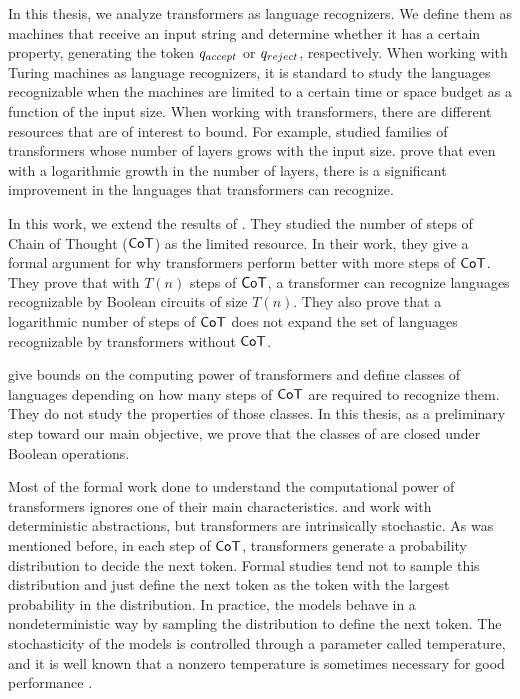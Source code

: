 \bigskip

In this thesis, we analyze transformers as language recognizers.
We define them as machines that receive an input string and determine whether it has a certain property, generating the token $q_{accept}$ or $q_{reject}$, respectively.
When working with Turing machines as language recognizers, it is standard to study the languages recognizable when the machines are limited to a certain time or space budget as a function of the input size.
When working with transformers, there are different resources that are of interest to bound.
For example, \citet{merrill2026little} studied families of transformers whose number of layers grows with the input size.
\citet{merrill2026little} prove that even with a logarithmic growth in the number of layers, there is a significant improvement in the languages that transformers can recognize.

In this work, we extend the results of \citet{toyota}.
They studied the number of steps of Chain of Thought ($\mathsf{CoT}$) as the limited resource.
In their work, they give a formal argument for why transformers perform better with more steps of $\mathsf{CoT}$.
They prove that with $T(n)$ steps of $\mathsf{CoT}$, a transformer can recognize languages recognizable by Boolean circuits of size $T(n)$.
They also prove that a logarithmic number of steps of $\mathsf{CoT}$ does not expand the set of languages recognizable by transformers without $\mathsf{CoT}$.

\citet{toyota} give bounds on the computing power of transformers and define classes of languages depending on how many steps of $\mathsf{CoT}$ are required to recognize them.
They do not study the properties of those classes.
In this thesis, as a preliminary step toward our main objective, we prove that the classes of \citet{toyota} are closed under Boolean operations.

\medskip

Most of the formal work done to understand the computational power of transformers ignores one of their main characteristics.
\citet{toyota} and \citet{merrill2026little} work with deterministic abstractions, but transformers are intrinsically stochastic.
As was mentioned before, in each step of $\mathsf{CoT}$, transformers generate a probability distribution to decide the next token.
Formal studies tend not to sample this distribution and just define the next token as the token with the largest probability in the distribution.
In practice, the models behave in a nondeterministic way by sampling the distribution to define the next token.
The stochasticity of the models is controlled through a parameter called temperature, and it is well known that a nonzero temperature is sometimes necessary for good performance \citep{demir2025optimal}.

